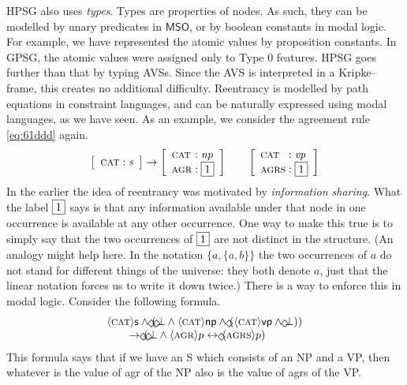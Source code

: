 HPSG also uses {\it types}. Types are properties of nodes. As
such, they can be modelled by unary predicates in $\mathsf{MSO}$, or by
boolean constants in modal logic. For example, we have represented
the atomic values by proposition constants.  In GPSG, the atomic
values were assigned only to Type 0 features. HPSG goes further
than that by typing AVSs. Since the AVS is interpreted in a
Kripke--frame, this creates no additional difficulty. Reentrancy
is modelled by path equations in constraint languages, and can 
be naturally expressed using modal languages, as we have
seen.  As an example, we consider the agreement rule \eqref{eq:61ddd} 
again.
\begin{equation}
\left[\begin{array}{l@{\; : \;}l}
\mbox{\sc cat} & \mbox{\it s}
\end{array}\right]
\pf
\left[\begin{array}{l@{\; : \;}l}
\mbox{\sc cat} & \mbox{\it np} \\
\mbox{\sc agr} & \framebox{1}
\end{array}\right]
\qquad
\left[\begin{array}{l@{\; : \;}l}
\mbox{\sc cat} & \mbox{\it vp} \\
\mbox{\sc agrs} & \framebox{1} \\
\end{array}\right]
\end{equation}
In the earlier \cite{pollardsag:hpsg1} the idea of reentrancy was
motivated by {\it information sharing}. What the label
$\framebox{1}$ says is that any information available under that
node in one occurrence is available at any other occurrence. One
way to make this true is to simply say that the two occurrences of
$\framebox{1}$ are not distinct in the structure. (An analogy
might help here. In the notation $\{a, \{a,b\}\}$ the two
occurrences of $a$ do not stand for different things of the
universe: they both denote $a$, just that the linear notation
forces us to write it down twice.) There is a way to enforce this
in modal logic. Consider the following formula.
\begin{equation}
\begin{array}{l}
\auf \mbox{\sc cat}\zu \mathsf{s} \und
    \unten(\links \bot \und \auf \mbox{\sc cat}\zu
    \mathsf{np} \und \rechts (\auf \mbox{\sc cat}\zu\mathsf{vp}
    \und \rechts \bot)) \\
\qquad \pf \unten(\links \bot \und \auf\mbox{\sc agr}\zu p \dpf
    \rechts \auf \mbox{\sc agrs}\zu p)
\end{array}
\end{equation}
This formula says that if we have an S which consists of an NP and
a VP, then whatever is the value of {\sc agr} of the NP also is
the value of {\sc agrs} of the VP.

